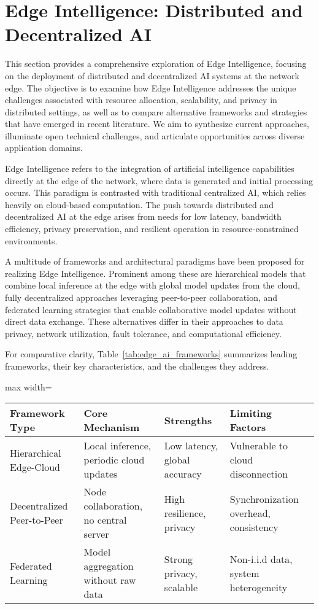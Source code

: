 \documentclass[sigconf]{acmart}
\begin{document}
\section{Edge Intelligence: Distributed and Decentralized AI}

This section provides a comprehensive exploration of Edge Intelligence, focusing on the deployment of distributed and decentralized AI systems at the network edge. The objective is to examine how Edge Intelligence addresses the unique challenges associated with resource allocation, scalability, and privacy in distributed settings, as well as to compare alternative frameworks and strategies that have emerged in recent literature. We aim to synthesize current approaches, illuminate open technical challenges, and articulate opportunities across diverse application domains.

Edge Intelligence refers to the integration of artificial intelligence capabilities directly at the edge of the network, where data is generated and initial processing occurs. This paradigm is contrasted with traditional centralized AI, which relies heavily on cloud-based computation. The push towards distributed and decentralized AI at the edge arises from needs for low latency, bandwidth efficiency, privacy preservation, and resilient operation in resource-constrained environments.

A multitude of frameworks and architectural paradigms have been proposed for realizing Edge Intelligence. Prominent among these are hierarchical models that combine local inference at the edge with global model updates from the cloud, fully decentralized approaches leveraging peer-to-peer collaboration, and federated learning strategies that enable collaborative model updates without direct data exchange. These alternatives differ in their approaches to data privacy, network utilization, fault tolerance, and computational efficiency.

For comparative clarity, Table~\ref{tab:edge_ai_frameworks} summarizes leading frameworks, their key characteristics, and the challenges they address.

\begin{table*}[htbp]
\centering
\caption{Comparative Summary of Edge Intelligence Frameworks}
\label{tab:edge_ai_frameworks}
\begin{adjustbox}{max width=\textwidth}
\begin{tabular}{@{}llll@{}}
\toprule
Framework Type & Core Mechanism & Strengths & Limiting Factors \\
\midrule
Hierarchical Edge-Cloud & Local inference, periodic cloud updates & Low latency, global accuracy & Vulnerable to cloud disconnection \\
Decentralized Peer-to-Peer & Node collaboration, no central server & High resilience, privacy & Synchronization overhead, consistency \\
Federated Learning & Model aggregation without raw data & Strong privacy, scalable & Non-i.i.d data, system heterogeneity \\
\bottomrule
\end{tabular}
\end{adjustbox}
\end{table*}
\end{document}
